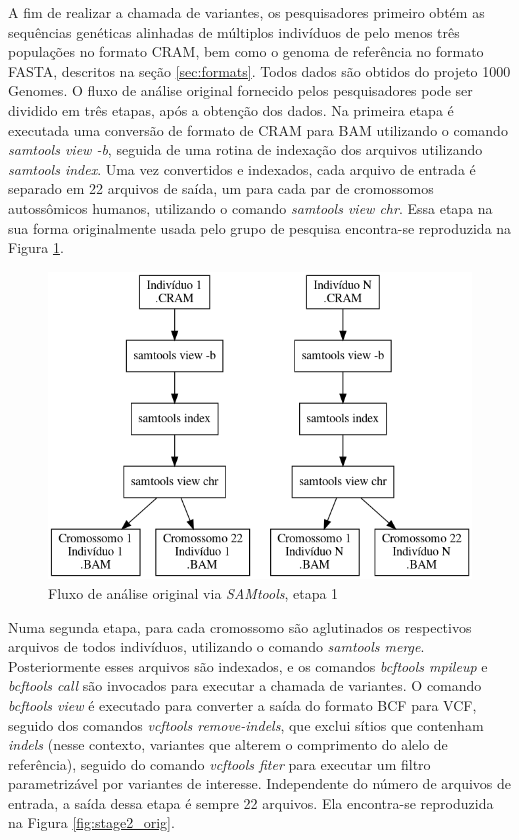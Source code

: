 \documentclass[cic,tc]{iiufrgs}
\begin{document}
A fim de realizar a chamada de variantes, os pesquisadores primeiro obtém as
sequências genéticas alinhadas de múltiplos indivíduos de pelo menos três
populações no formato CRAM, bem como o genoma de referência no formato FASTA,
descritos na seção \ref{sec:formats}. Todos dados são obtidos do projeto 1000
Genomes. O fluxo de análise original fornecido pelos pesquisadores pode ser
dividido em três etapas, após a obtenção dos dados. Na primeira etapa é
executada uma conversão de formato de CRAM para BAM utilizando o comando
\textit{samtools view -b}, seguida de uma rotina de indexação dos arquivos
utilizando \textit{samtools index}. Uma vez convertidos e indexados, cada
arquivo de entrada é separado em 22 arquivos de saída, um para cada par de
cromossomos autossômicos humanos, utilizando o comando \textit{samtools view
chr}. Essa etapa na sua forma originalmente usada pelo grupo de pesquisa
encontra-se reproduzida na Figura \ref{fig:stage1_orig}.

\begin{figure}
  \caption{Fluxo de análise original via \textit{SAMtools}, etapa 1}
    \begin{center}
      \includegraphics[width=0.85\linewidth]{img/stage1_orig.png}
    \end{center}
    \label{fig:stage1_orig}
\end{figure}

Numa segunda etapa, para cada cromossomo são aglutinados os respectivos
arquivos de todos indivíduos, utilizando o comando \textit{samtools merge}.
Posteriormente esses arquivos são indexados, e os comandos \textit{bcftools
mpileup} e \textit{bcftools call} são invocados para executar a chamada de
variantes. O comando \textit{bcftools view} é executado para converter a saída
do formato BCF para VCF, seguido dos comandos \textit{vcftools remove-indels},
que exclui sítios que contenham \textit{indels} (nesse contexto, variantes que
alterem o comprimento do alelo de referência), seguido do comando
\textit{vcftools fiter} para executar um filtro parametrizável por variantes de
interesse. Independente do número de arquivos de entrada, a saída dessa etapa é
sempre 22 arquivos. Ela encontra-se reproduzida na
Figura \ref{fig:stage2_orig}.
\end{document}
